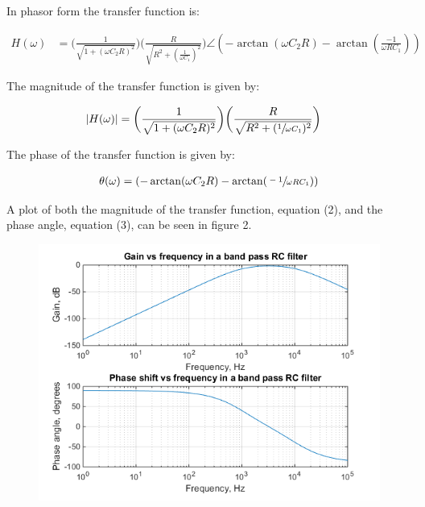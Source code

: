 \documentclass{article}
\begin{document}
\begin{description}
In phasor form the transfer function is:

\begin{align*}
	H(\omega) &= \bigg(\frac{1}{\sqrt{1 + (\omega C_2 R)^2}}\bigg) \bigg(\frac{R}{\sqrt{R^2 + (\frac{1}{\omega C_1})^2}}\bigg) \angle (-\arctan(\omega C_2 R) - \arctan(\frac{-1}{\omega R C_1}))
\end{align*}

The magnitude of the transfer function is given by:

\begin{align}
	|H(\omega)| &= \bigg(\frac{1}{\sqrt{1 + (\omega C_2 R)^2}}\bigg) \bigg(\frac{R}{\sqrt{R^2 + (\sfrac{1}{\omega C_1})^2}}\bigg)
\end{align}

The phase of the transfer function is given by:

\begin{align}
	\theta(\omega) = (-\arctan(\omega C_2 R) - \arctan(\sfrac{-1}{\omega R C_1}))
\end{align}

A plot of both the magnitude of the transfer function, equation (2), and the phase angle, equation (3), can be seen in figure 2.

\begin{center}
	\begin{figure}[H]
		\begin{minipage}{0.6\textwidth}
			\includegraphics[scale=0.8]{bode1}
		\end{minipage}
	\end{figure}
\end{center}

\end{description} 
\end{document}
